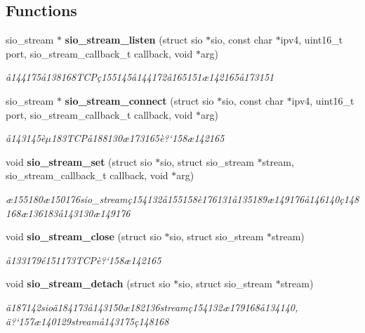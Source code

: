 \subsection*{Functions}
\begin{CompactItemize}
\item 
sio\_\-stream $\ast$ {\bf sio\_\-stream\_\-listen} (struct sio $\ast$sio, const char $\ast$ipv4, uint16\_\-t port, sio\_\-stream\_\-callback\_\-t callback, void $\ast$arg)
\begin{CompactList}\small\item\em \aa{}144175\aa{}138168TCP\c{c}155145\aa{}144172\aa{}165151\ae{}142165\aa{}173151 \item\end{CompactList}\item 
sio\_\-stream $\ast$ {\bf sio\_\-stream\_\-connect} (struct sio $\ast$sio, const char $\ast$ipv4, uint16\_\-t port, sio\_\-stream\_\-callback\_\-t callback, void $\ast$arg)
\begin{CompactList}\small\item\em \aa{}143145\`{e}$\mu$183TCP\aa{}188130\ae{}173165\`{e}?`158\ae{}142165 \item\end{CompactList}\item 
void {\bf sio\_\-stream\_\-set} (struct sio $\ast$sio, struct sio\_\-stream $\ast$stream, sio\_\-stream\_\-callback\_\-t callback, void $\ast$arg)
\begin{CompactList}\small\item\em \ae{}155180\ae{}150176sio\_\-stream\c{c}154132\aa{}155158\`{e}176131\aa{}135189\ae{}149176\aa{}146140\c{c}148168\ae{}136183\aa{}143130\ae{}149176 \item\end{CompactList}\item 
void {\bf sio\_\-stream\_\-close} (struct sio $\ast$sio, struct sio\_\-stream $\ast$stream)
\begin{CompactList}\small\item\em \aa{}133179\'{e}151173TCP\`{e}?`158\ae{}142165 \item\end{CompactList}\item 
void {\bf sio\_\-stream\_\-detach} (struct sio $\ast$sio, struct sio\_\-stream $\ast$stream)
\begin{CompactList}\small\item\em \"{a}187142sio\"{a}184173\aa{}143150\ae{}182136stream\c{c}154132\ae{}179168\aa{}134140, \"{a}?`157\ae{}140129stream\aa{}143175\c{c}148168 \item\end{CompactList}\item 

\end{CompactItemize}
